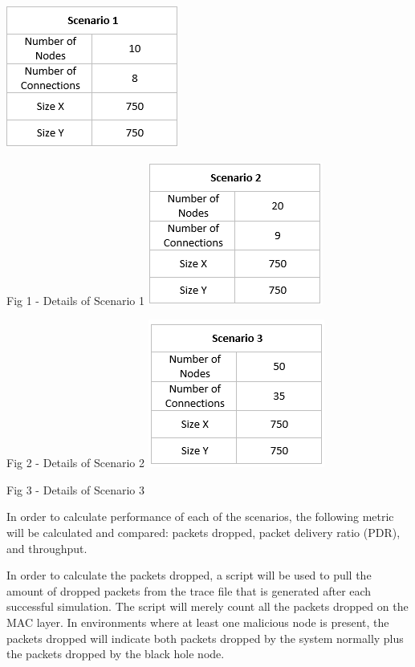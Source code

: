 \documentclass[conference,12pt]{IEEEtran}
\begin{document}
\begin{center}
\includegraphics{Scenario1}

Fig 1 - Details of Scenario 1
\linebreak 
\linebreak 
\includegraphics{Scen2}

Fig 2 - Details of Scenario 2
\linebreak 
\linebreak 
\includegraphics{Scen3}

Fig 3 - Details of Scenario 3
\linebreak 
\end{center}

In order to calculate performance of each of the scenarios, the following metric will be calculated and compared: packets dropped, packet delivery ratio (PDR), and throughput.

In order to calculate the packets dropped, a script will be used to pull the amount of dropped packets from the trace file that is generated after each successful simulation. The script will merely count all the packets dropped on the MAC layer. In environments where at least one malicious node is present, the packets dropped will indicate both packets dropped by the system normally plus the packets dropped by the black hole node. 
\end{document}
